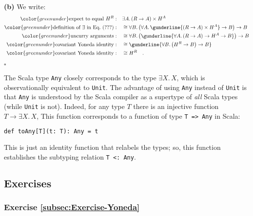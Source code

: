 \textbf{(b)} We write:
\begin{align*}
{\color{greenunder}\text{expect to equal }H^{R}:}\quad & \exists A.\,(R\rightarrow A)\times H^{A}\\
{\color{greenunder}\text{definition of }\exists\text{ in Eq.~}(???):}\quad & \cong\forall B.\,\big(\forall A.\,\gunderline{(R\rightarrow A)\times H^{A}}\rightarrow B\big)\rightarrow B\\
{\color{greenunder}\text{uncurry arguments}:}\quad & \cong\forall B.\,\big(\gunderline{\forall A.\,(R\rightarrow A)\rightarrow H^{A}\rightarrow B}\big)\rightarrow B\\
{\color{greenunder}\text{covariant Yoneda identity}:}\quad & \cong\gunderline{\forall B.\,\big(H^{R}\rightarrow B\big)\rightarrow B}\\
{\color{greenunder}\text{covariant Yoneda identity}:}\quad & \cong H^{R}\quad.
\end{align*}

$\square$

The Scala type \lstinline!Any!
closely corresponds to the type $\exists X.\,X$, which is observationally
equivalent to \lstinline!Unit!.
The advantage of using \lstinline!Any!
instead of \lstinline!Unit!
is that \lstinline!Any!
is understood by the Scala compiler as a supertype of \emph{all} Scala
types (while \lstinline!Unit!
is not). Indeed, for any type $T$ there is an injective function
$T\rightarrow\exists X.\,X$, This function corresponds to a function
of type \lstinline!T => Any!
in Scala:
\begin{lstlisting}
def toAny[T](t: T): Any = t
\end{lstlisting}
 This is just an identity function that relabels the types; so, this
function establishes the subtyping relation \lstinline!T <: Any!.

\subsection{Exercises}

\subsubsection{Exercise \label{subsec:Exercise-Yoneda}\ref{subsec:Exercise-Yoneda}}

